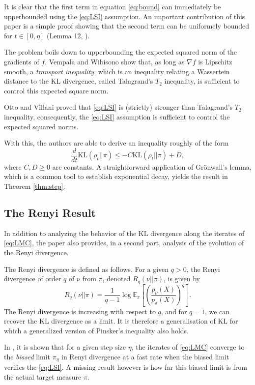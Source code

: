 \documentclass[11pt,twoside]{article}
\theoremstyle{definition}
\newcommand{\E}{\mathbb{E}}
\newcommand{\KL}{\text{KL}}
\begin{document}
It is clear that the {\color{Fuchsia} first} term in equation \eqref{eq:bound} can immediately be upperbounded using the \eqref{eq:LSI} assumption. An important contribution of this paper is a simple proof showing that the {\color{Bittersweet} second} term can be uniformely bounded for $t \in [0, \eta]$ (Lemma 12, \cite{vempala_rapid_2019}).

The problem boils down to upperbounding the expected squared norm of the gradients of $f$. Vempala and Wibisono show that, as long as $\nabla f$ is Lipschitz smooth, a \textit{transport inequality}, which is an inequality relating a Wassertein distance to the KL divergence, called Talagrand's $T_2$ inequality, is sufficient to control this expected square norm. 

Otto and Villani \cite{otto_generalization_2000} proved that \eqref{eq:LSI} is (strictly) stronger than Talagrand's $T_2$ inequality, consequently, the \eqref{eq:LSI} assumption is sufficient to control the expected squared norms.

With this, the authors are able to derive an inequality roughly of the form
\[
\frac{d}{dt}\KL(\rho_t || \pi) \leq -C\KL(\rho_t || \pi) + D,
\]
where $C, D \geq 0$ are constants. A straightforward application of Gr\"onwall's lemma, which is a common tool to establish exponential decay, yields the result in Theorem \ref{thm:step}.

\subsection{The Renyi Result}

In addition to analyzing the behavior of the $\KL$ divergence along the iterates of \eqref{eq:LMC}, the paper also provides, in a second part, analysis of the evolution of the Renyi divergence.

The Renyi divergence is defined as follows. For a given $q > 0$, the Renyi divergence of order $q$ of $\nu$ from $\pi$, denoted $R_q(\nu || \pi)$, is given by
\[
R_q(\nu || \pi) = \frac{1}{q-1}\log\E_\pi\left[\left( \frac{p_{\nu}(X)}{p_\pi(X)}\right)^q\right].
\]
The Renyi divergence is increasing with respect to $q$, and for $q=1$, we can recover the $\KL$ divergence as a limit. It is therefore a generalisation of $\KL$ for which a generalized version of Pinsker's inequality also holds.

In \cite{vempala_rapid_2019}, it is shown that for a given step size $\eta$, the iterates of \eqref{eq:LMC} converge to the \textit{biased} limit $\pi_\eta$ in Renyi divergence at a fast rate when the biased limit verifies the \eqref{eq:LSI}. A missing result however is how far this biased limit is from the actual target measure $\pi$.
\end{document}
